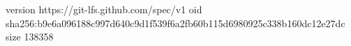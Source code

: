 version https://git-lfs.github.com/spec/v1
oid sha256:b9e6a096188c997d640c9d1f539f6a2fb60b115d6980925c338b160dc12e27dc
size 138358

